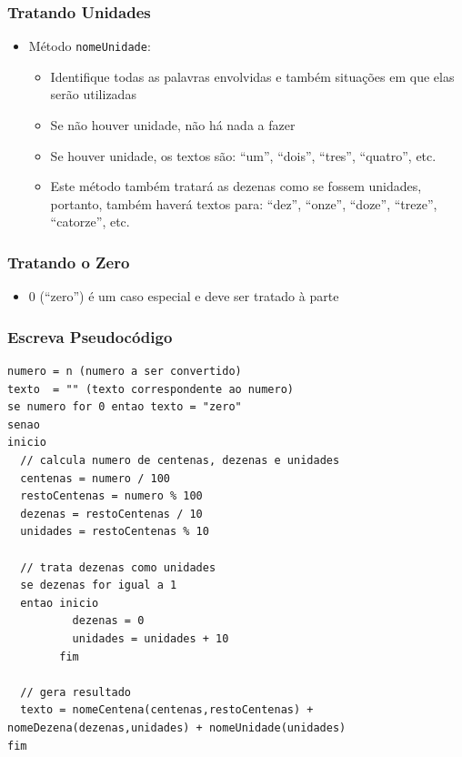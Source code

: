 \documentclass[xcolor={dvipsnames,table},aspectratio=169]{beamer}
\begin{document}
\begin{frame}\frametitle{Tratando Unidades}
\begin{itemize}
	\item Método \texttt{nomeUnidade}:
	\begin{itemize}
		\item Identifique todas as palavras envolvidas e também situações em que elas serão utilizadas
		\item Se não houver unidade, não há nada a fazer
		\item Se houver unidade, os textos são: ``um'', ``dois'', ``tres'', ``quatro'', etc.
		\item Este método também tratará as dezenas como se fossem unidades, portanto, também haverá textos para: ``dez'', ``onze'', ``doze'', ``treze'', ``catorze'', etc.
	\end{itemize}
\end{itemize}
\end{frame}

\begin{frame}\frametitle{Tratando o Zero}
\begin{itemize}
	\item 0 (``zero'') é um caso especial e deve ser tratado à parte
\end{itemize}
\end{frame}

\begin{frame}[fragile]\frametitle{Escreva Pseudocódigo}
{\tiny
\begin{verbatim}
numero = n (numero a ser convertido)
texto  = "" (texto correspondente ao numero)
se numero for 0 entao texto = "zero"
senao
inicio
  // calcula numero de centenas, dezenas e unidades
  centenas = numero / 100
  restoCentenas = numero % 100
  dezenas = restoCentenas / 10
  unidades = restoCentenas % 10

  // trata dezenas como unidades
  se dezenas for igual a 1
  entao inicio
          dezenas = 0
          unidades = unidades + 10
        fim

  // gera resultado
  texto = nomeCentena(centenas,restoCentenas) + nomeDezena(dezenas,unidades) + nomeUnidade(unidades)
fim
\end{verbatim}
}
\end{frame}
\end{document}
